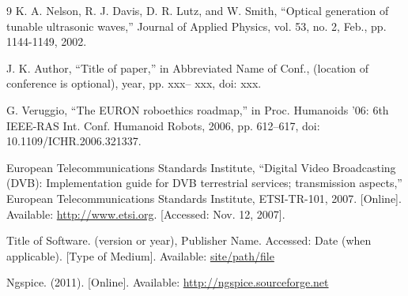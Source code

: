 \documentclass[a4paper,twoside,11pt]{report}
\begin{document}
\begin{thebibliography}{9}
K. A. Nelson, R. J. Davis, D. R. Lutz, and W. Smith, “Optical generation of tunable ultrasonic waves,” Journal of Applied Physics, vol. 53, no. 2, Feb., pp. 1144-1149, 2002.

J. K. Author, “Title of paper,” in Abbreviated Name of Conf., (location of conference is optional), year, pp. xxx– xxx, doi: xxx. 

G. Veruggio, “The EURON roboethics roadmap,” in Proc. Humanoids ’06: 6th IEEE-RAS Int. Conf. Humanoid Robots, 2006, pp. 612–617, doi: 10.1109/ICHR.2006.321337.


European Telecommunications Standards Institute, “Digital Video Broadcasting (DVB): Implementation guide for DVB terrestrial services; transmission aspects,” European Telecommunications Standards Institute, ETSI-TR-101, 2007. [Online]. Available: \url{http://www.etsi.org}. [Accessed: Nov. 12, 2007].

Title of Software. (version or year), Publisher Name. Accessed: Date (when applicable). [Type of Medium]. Available: \url{site/path/file}

Ngspice. (2011). [Online]. Available: \url{http://ngspice.sourceforge.net}

\end{thebibliography}
\end{document}
